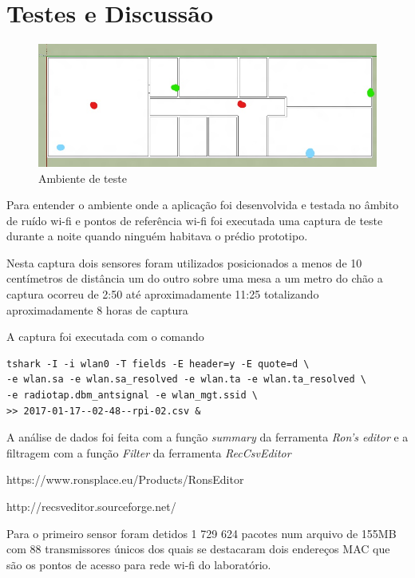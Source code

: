 \chapter{Testes e Discussão}
\label{chap:Testes}


\begin{figure}[htb]
	\caption{\label{fig-planta-baixa}Ambiente de teste}
	\begin{center}
		\includegraphics[width=1\textwidth]{060-testes/data-analisis/planta-baixa_Ink_LI.jpg}
	\end{center}
\end{figure}


Para entender  o ambiente onde a aplicação foi desenvolvida e testada no âmbito
de ruído wi-fi e pontos de referência wi-fi foi executada uma captura de teste
durante a noite quando ninguém habitava o prédio prototipo.

Nesta captura dois sensores foram utilizados posicionados a menos de 10 centímetros
de distância um do outro sobre uma mesa a um metro do chão a captura ocorreu de 2:50
até aproximadamente 11:25 totalizando aproximadamente 8 horas de captura

A captura foi executada com o comando


\begin{verbatim}
tshark -I -i wlan0 -T fields -E header=y -E quote=d \
-e wlan.sa -e wlan.sa_resolved -e wlan.ta -e wlan.ta_resolved \
-e radiotap.dbm_antsignal -e wlan_mgt.ssid \
>> 2017-01-17--02-48--rpi-02.csv &
\end{verbatim}

A análise de dados foi feita com a função \emph{summary} da ferramenta \emph{Ron’s editor}
e a filtragem com a função \emph{Filter} da ferramenta \emph{RecCsvEditor}

https://www.ronsplace.eu/Products/RonsEditor

http://recsveditor.sourceforge.net/

Para o primeiro sensor foram detidos 1 729 624 pacotes num arquivo de 155MB
com 88 transmissores únicos dos quais se destacaram dois endereços MAC que são os
pontos de acesso para rede wi-fi do laboratório.


